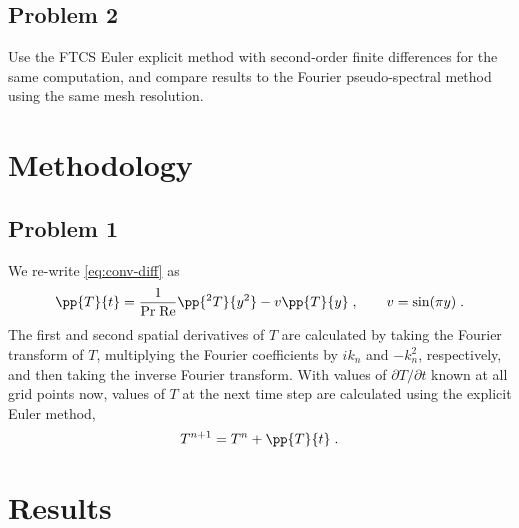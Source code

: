 \documentclass[11pt]{article}
\begin{document}
\subsection{Problem 2}

Use the FTCS Euler explicit method with second-order finite differences for the same computation, and compare results to the Fourier pseudo-spectral method using the same mesh resolution.

\section{Methodology} %

\subsection{Problem 1}

We re-write \eqref{eq:conv-diff} as
\begin{equation}
\pp{T}{t} = \frac{1}{\text{Pr}\;\text{Re}} \pp{^2T}{y^2} - v \pp{T}{y} 
\;, \qquad
v = \sin(\pi y)
\;.
\end{equation}
The first and second spatial derivatives of $T$ are calculated by taking the Fourier transform of $T$, multiplying the Fourier coefficients by $i k_n$ and $-k_n^2$, respectively, and then taking the inverse Fourier transform. With values of $\partial T / \partial t$ known at all grid points now, values of $T$ at the next time step are calculated using the explicit Euler method,
\begin{equation}
T^{n+1} = T^n + \pp{T}{t}
\;.
\end{equation}

\section{Results} %

\end{document}
